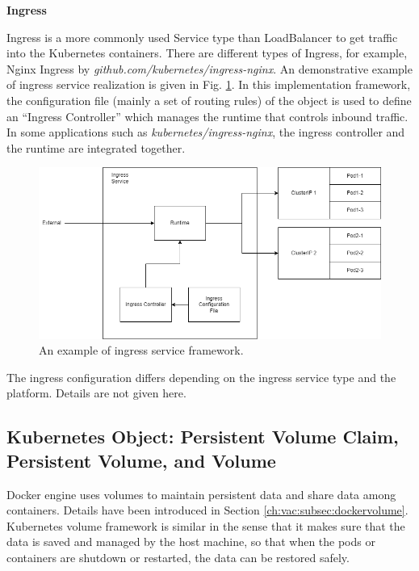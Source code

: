 \vspace{0.1in}
\noindent \textbf{Ingress}
\vspace{0.1in}

Ingress is a more commonly used Service type than LoadBalancer to get traffic into the Kubernetes containers. There are different types of Ingress, for example, Nginx Ingress by \textit{github.com/kubernetes/ingress-nginx}. An demonstrative example of ingress service realization is given in Fig. \ref{ch:vac:fig:ingress_service}. In this implementation framework, the configuration file (mainly a set of routing rules) of the object is used to define an ``Ingress Controller'' which manages the runtime that controls inbound traffic. In some applications such as \textit{kubernetes/ingress-nginx}, the ingress controller and the runtime are integrated together.

\begin{figure}
	\centering
	\includegraphics[width=350pt]{chapters/ch-virtualization-and-containerization/figures/ingress_service.png}
	\caption{An example of ingress service framework.} \label{ch:vac:fig:ingress_service}
\end{figure}

The ingress configuration differs depending on the ingress service type and the platform. Details are not given here.

\subsection{Kubernetes Object: Persistent Volume Claim, Persistent Volume, and Volume} \label{ch:vac:subsec:k8svolume}

Docker engine uses volumes to maintain persistent data and share data among containers. Details have been introduced in Section \ref{ch:vac:subsec:dockervolume}. Kubernetes volume framework is similar in the sense that it makes sure that the data is saved and managed by the host machine, so that when the pods or containers are shutdown or restarted, the data can be restored safely.

